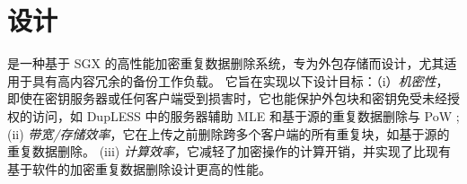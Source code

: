 \section{\sysname 设计}
\label{sec:design}

\sysname 是一种基于 SGX 的高性能加密重复数据删除系统，专为外包存储而设计，尤其适用于具有高内容冗余的备份工作负载。 它旨在实现以下设计目标：（i）{\em 机密性}，即使在密钥服务器或任何客户端受到损害时，它也能保护外包块和密钥免受未经授权的访问，如 DupLESS \cite{bellare13b} 中的服务器辅助 MLE 和基于源的重复数据删除与 PoW \cite{halevi11}; (ii) {\em 带宽/存储效率}，它在上传之前删除跨多个客户端的所有重复块，如基于源的重复数据删除。 (iii) {\em 计算效率}，它减轻了加密操作的计算开销，并实现了比现有基于软件的加密重复数据删除设计更高的性能。

 




